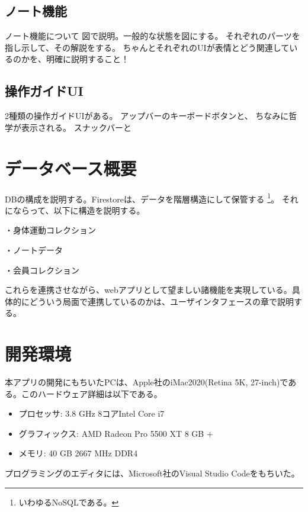 \subsection{ノート機能}
ノート機能について
図で説明。一般的な状態を図にする。
それぞれのパーツを指し示して、その解説をする。
ちゃんとそれぞれのUIが表情とどう関連しているのかを、明確に説明すること！

\subsection{操作ガイドUI}
2種類の操作ガイドUIがある。
アップバーのキーボードボタンと、
ちなみに哲学が表示される。
スナックバーと

\section{データベース概要}
DBの構成を説明する。Firestoreは、データを階層構造にして保管する
\footnote{いわゆるNoSQLである。}。
それにならって、以下に構造を説明する。

・身体運動コレクション


・ノートデータ


・会員コレクション

これらを連携させながら、webアプリとして望ましい諸機能を実現している。具体的にどういう局面で連携しているのかは、ユーザインタフェースの章で説明する。

\section{開発環境}
本アプリの開発にもちいたPCは、Apple社のiMac2020(Retina 5K, 27-inch)である。このハードウェア詳細は以下である。
\begin{itemize}
  \item {プロセッサ: 3.8 GHz 8コアIntel Core i7}
  \item {グラフィックス: AMD Radeon Pro 5500 XT 8 GB + }
  \item {メモリ: 40 GB 2667 MHz DDR4}  
\end{itemize}
プログラミングのエディタには、Microsoft社のVisual Studio Code\cite{vscode}をもちいた。





